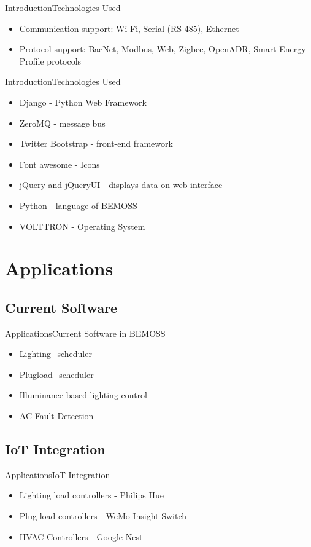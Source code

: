 \documentclass{beamer}
\begin{document}
\begin{frame}{Introduction}{Technologies Used}
	\begin{itemize}
		\item Communication support: Wi-Fi, Serial (RS-485), Ethernet
		\item Protocol support: BacNet, Modbus, Web, Zigbee, OpenADR, Smart Energy Profile protocols	
	
	\end{itemize}
\end{frame}


\begin{frame}{Introduction}{Technologies Used}
	\begin{itemize}
		\item Django - Python Web Framework
		\item ZeroMQ - message bus
		\item Twitter Bootstrap - front-end framework
		\item Font awesome - Icons
		\item jQuery and jQueryUI - displays data on web interface
		\item Python - language of BEMOSS
		\item VOLTTRON - Operating System
	\end{itemize}
\end{frame}


\section{Applications}

\subsection{Current Software}
\begin{frame}{Applications}{Current Software in BEMOSS}
	\begin{itemize}
		\item Lighting\_scheduler
		\item Plugload\_scheduler
		\item Illuminance based lighting control
		\item AC Fault Detection
	\end{itemize}
\end{frame}

\subsection{IoT Integration}
\begin{frame}{Applications}{IoT Integration}
	\begin{itemize}
		\item Lighting load controllers - Philips Hue
		\item Plug load controllers - WeMo Insight Switch 
		\item HVAC Controllers - Google Nest
	\end{itemize}
\end{frame}
\end{document}
